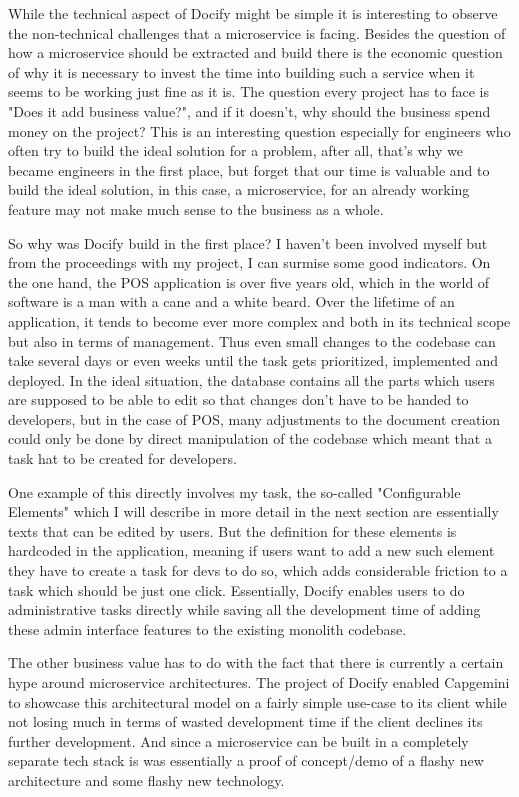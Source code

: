 While the technical aspect of Docify might be simple it is interesting to observe the non-technical challenges that a microservice is facing. Besides the question of how a microservice should be extracted and build there is the economic question of why it is necessary to invest the time into building such a service when it seems to be working just fine as it is. The question every project has to face is "Does it add business value?", and if it doesn't, why should the business spend money on the project? This is an interesting question especially for engineers who often try to build the ideal solution for a problem, after all, that's why we became engineers in the first place, but forget that our time is valuable and to build the ideal solution, in this case, a microservice, for an already working feature may not make much sense to the business as a whole.

So why was Docify build in the first place? I haven't been involved myself but from the proceedings with my project, I can surmise some good indicators. On the one hand, the POS application is over five years old, which in the world of software is a man with a cane and a white beard. Over the lifetime of an application, it tends to become ever more complex and both in its technical scope but also in terms of management. Thus even small changes to the codebase can take several days or even weeks until the task gets prioritized, implemented and deployed. In the ideal situation, the database contains all the parts which users are supposed to be able to edit so that changes don't have to be handed to developers, but in the case of POS, many adjustments to the document creation could only be done by direct manipulation of the codebase which meant that a task hat to be created for developers.

One example of this directly involves my task, the so-called "Configurable Elements" which I will describe in more detail in the next section are essentially texts that can be edited by users. But the definition for these elements is hardcoded in the application, meaning if users want to add a new such element they have to create a task for devs to do so, which adds considerable friction to a task which should be just one click. Essentially, Docify enables users to do administrative tasks directly while saving all the development time of adding these admin interface features to the existing monolith codebase.

The other business value has to do with the fact that there is currently a certain hype around microservice architectures. The project of Docify enabled Capgemini to showcase this architectural model on a fairly simple use-case to its client while not losing much in terms of wasted development time if the client declines its further development. And since a microservice can be built in a completely separate tech stack is was essentially a proof of concept/demo of a flashy new architecture and some flashy new technology.

